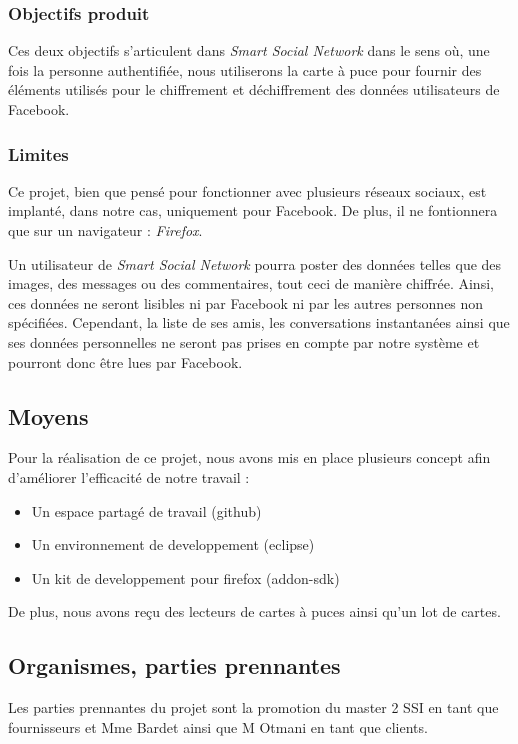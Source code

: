 \documentclass[a4paper,11pt,french]{article}
\begin{document}
\subsubsection{Objectifs produit}
	Ces deux objectifs s'articulent dans \emph{Smart Social Network} dans
le sens où, une fois la personne authentifiée, nous utiliserons la carte à
puce pour fournir des éléments utilisés pour le chiffrement et déchiffrement
des données utilisateurs de Facebook.

\subsubsection{Limites}
	Ce projet, bien que pensé pour fonctionner avec plusieurs réseaux
sociaux, est implanté, dans notre cas, uniquement pour Facebook. De plus,
il ne fontionnera que sur un navigateur : \emph{Firefox}.


	Un utilisateur de \emph{Smart Social Network} pourra poster des
données telles que des images, des messages ou des commentaires, tout ceci de
manière chiffrée. Ainsi, ces données ne seront lisibles ni par Facebook ni par
les autres personnes non spécifiées. Cependant, la liste de ses amis, les
conversations instantanées ainsi que ses données personnelles ne seront pas
prises en compte par notre système et pourront donc être lues par Facebook.

\subsection{Moyens}
	Pour la réalisation de ce projet, nous avons mis en place plusieurs
concept afin d'améliorer l'efficacité de notre travail :
\begin{itemize}
	\item Un espace partagé de travail (github)
	\item Un environnement de developpement (eclipse)
	\item Un kit de developpement pour firefox (addon-sdk)
\end{itemize}

	De plus, nous avons reçu des lecteurs de cartes à puces ainsi qu'un
lot de cartes.


\subsection{Organismes, parties prennantes}
	Les parties prennantes du projet sont la promotion du master 2 SSI
en tant que fournisseurs et Mme Bardet ainsi que M Otmani en tant que clients.
\end{document}
